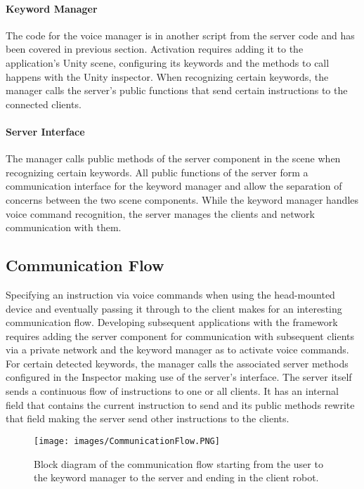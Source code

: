 \paragraph{Keyword Manager}
The code for the voice manager is in another script from the server code and has been covered in previous section. Activation requires adding it to the application's Unity scene, configuring its keywords and the methods to call happens with the Unity inspector. When recognizing certain keywords, the manager calls the server's public functions that send certain instructions to the connected clients.

\paragraph{Server Interface}
The manager calls public methods of the server component in the scene when recognizing certain keywords. All public functions of the server form a communication interface for the keyword manager and allow the separation of concerns between the two scene components. While the keyword manager handles voice command recognition, the server manages the clients and network communication with them.



\newpage
\subsection{Communication Flow}
Specifying an instruction via voice commands when using the head-mounted device and eventually passing it through to the client makes for an interesting communication flow. Developing subsequent applications with the framework requires adding the server component for communication with subsequent clients via a private network and the keyword manager as to activate voice commands. For certain detected keywords, the manager calls the associated server methods configured in the Inspector making use of the server's interface. The server itself sends a continuous flow of instructions to one or all clients. It has an internal field that contains the current instruction to send and its public methods rewrite that field making the server send other instructions to the clients.

\begin{figure}[!htb]
	\texttt{[image: images/CommunicationFlow.PNG]}
	\captionsetup{width=1.0\textwidth}
	\centering
	\caption{Block diagram of the communication flow starting from the user to the keyword manager to the server and ending in the client robot.} 
\end{figure}


